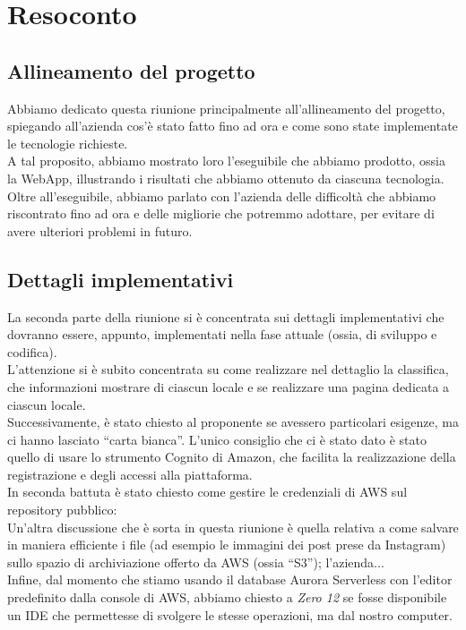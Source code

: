 \section{Resoconto}


\subsection{Allineamento del progetto}

Abbiamo dedicato questa riunione principalmente all'allineamento del progetto, spiegando all'azienda cos'è stato fatto fino ad ora e come sono state implementate le tecnologie richieste. \\
A tal proposito, abbiamo mostrato loro l'eseguibile che abbiamo prodotto, ossia la WebApp, illustrando i risultati che abbiamo ottenuto da ciascuna tecnologia. \\

Oltre all'eseguibile, abbiamo parlato con l'azienda delle difficoltà che abbiamo riscontrato fino ad ora e delle migliorie che potremmo adottare, per evitare di avere ulteriori problemi in futuro. 

\subsection{Dettagli implementativi}

La seconda parte della riunione si è concentrata sui dettagli implementativi che dovranno essere, appunto, implementati nella fase attuale (ossia, di sviluppo e codifica). \\
L'attenzione si è subito concentrata su come realizzare nel dettaglio la classifica, che informazioni mostrare di ciascun locale e se realizzare una pagina dedicata a ciascun locale.
\\ 

Successivamente, è stato chiesto al proponente se avessero particolari esigenze, ma ci hanno lasciato “carta bianca”. L'unico consiglio che ci è stato dato è stato quello di usare lo strumento Cognito di Amazon, che facilita la realizzazione della registrazione e degli accessi alla piattaforma. \\

In seconda battuta è stato chiesto come gestire le credenziali di AWS sul repository pubblico: \\

Un'altra discussione che è sorta in questa riunione è quella relativa a come salvare in maniera efficiente i file (ad esempio le immagini dei post prese da Instagram) sullo spazio di archiviazione offerto da AWS (ossia “S3”); l'azienda... \\

Infine, dal momento che stiamo usando il database Aurora Serverless con l'editor predefinito dalla console di AWS, abbiamo chiesto a \textit{Zero 12} se fosse disponibile un IDE che permettesse di svolgere le stesse operazioni, ma dal nostro computer.

\pagebreak
